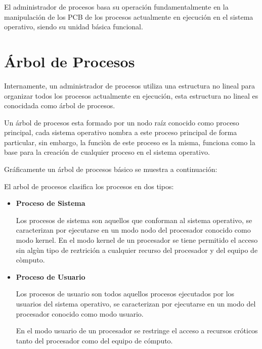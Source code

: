 \documentclass[12pt, fleqn]{report}                             %
\begin{document}
                El administrador de procesos basa su operación fundamentalmente en la manipulación de los PCB
                de los procesos actualmente en ejecución en el sistema operativo, siendo su unidad básica funcional.
        

        \clearpage
        \section{Árbol de Procesos}

            Internamente, un administrador de procesos utiliza una estructura no lineal para organizar todos
            los procesos actualmente en ejecución, esta estructura no lineal es conocidada como árbol de procesos.

            Un árbol de procesos esta formado por un nodo raíz conocido como proceso principal, cada sistema
            operativo nombra a este proceso principal de forma particular, sin embargo, la funciòn de este proceso
            es la misma, funciona como la base para la creación de cualquier proceso en el sistema operativo.

            Gráficamente un árbol de procesos básico se muestra a continuación: 

            El arbol de procesos clasifica los procesos en dos tipos:

            \begin{itemize}
                \item
                    \textbf{Proceso de Sistema}

                    Los procesos de sistema son aquellos que conforman al sistema operativo, se caracterizan
                    por ejecutarse en un modo nodo del procesador conocido como modo kernel.
                    En el modo kernel de un procesador se tiene permitido el acceso sin algùn tipo de reztrición
                    a cualquier recurso del procesador y del equipo de còmputo.


                \item
                    \textbf{Proceso de Usuario}

                    Los procesos de usuario son todos aquellos procesos ejecutados por los usuarios del sistema
                    operativo, se caracterizan por ejecutarse en un modo del procesador conocido como modo usuario.

                    En el modo usuario de un procesador se restringe el acceso a recursos cróticos tanto del
                    procesador como del equipo de cómputo.

            \end{itemize}
\end{document}
